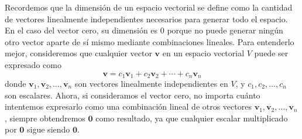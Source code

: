 Recordemos que la dimensión de un espacio vectorial se define como la cantidad de vectores linealmente independientes necesarios para generar todo el espacio. En el caso del vector cero, su dimensión es $0$ porque no puede generar ningún otro vector aparte de sí mismo mediante combinaciones lineales. Para entenderlo mejor, consideremos que cualquier vector $\mathbf{v}$ en un espacio vectorial $V$ puede ser expresado como
$$\mathbf{v} = c_1 \mathbf{v}_1 + c_2 \mathbf{v}_2 + \cdots + c_n \mathbf{v}_n$$
donde $\mathbf{v}_1, \mathbf{v}_2, \dots, \mathbf{v}_n$ son vectores linealmente independientes en $V$, y $c_1, c_2, \dots, c_n$ son escalares. Ahora, si consideramos el vector cero, no importa cuánto intentemos expresarlo como una combinación lineal de otros vectores $\mathbf{v}_1, \mathbf{v}_2, \dots, \mathbf{v}_n$, siempre obtendremos $\mathbf{0}$ como resultado, ya que cualquier escalar multiplicado por $\mathbf{0}$ sigue siendo $\mathbf{0}$.

\newpage

